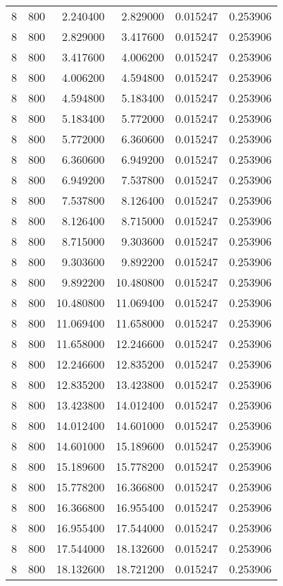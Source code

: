 \begin{longtable}{rrrrrr}
8 & 800 & 2.240400 & 2.829000 & 0.015247 & 0.253906 \\
8 & 800 & 2.829000 & 3.417600 & 0.015247 & 0.253906 \\
8 & 800 & 3.417600 & 4.006200 & 0.015247 & 0.253906 \\
8 & 800 & 4.006200 & 4.594800 & 0.015247 & 0.253906 \\
8 & 800 & 4.594800 & 5.183400 & 0.015247 & 0.253906 \\
8 & 800 & 5.183400 & 5.772000 & 0.015247 & 0.253906 \\
8 & 800 & 5.772000 & 6.360600 & 0.015247 & 0.253906 \\
8 & 800 & 6.360600 & 6.949200 & 0.015247 & 0.253906 \\
8 & 800 & 6.949200 & 7.537800 & 0.015247 & 0.253906 \\
8 & 800 & 7.537800 & 8.126400 & 0.015247 & 0.253906 \\
8 & 800 & 8.126400 & 8.715000 & 0.015247 & 0.253906 \\
8 & 800 & 8.715000 & 9.303600 & 0.015247 & 0.253906 \\
8 & 800 & 9.303600 & 9.892200 & 0.015247 & 0.253906 \\
8 & 800 & 9.892200 & 10.480800 & 0.015247 & 0.253906 \\
8 & 800 & 10.480800 & 11.069400 & 0.015247 & 0.253906 \\
8 & 800 & 11.069400 & 11.658000 & 0.015247 & 0.253906 \\
8 & 800 & 11.658000 & 12.246600 & 0.015247 & 0.253906 \\
8 & 800 & 12.246600 & 12.835200 & 0.015247 & 0.253906 \\
8 & 800 & 12.835200 & 13.423800 & 0.015247 & 0.253906 \\
8 & 800 & 13.423800 & 14.012400 & 0.015247 & 0.253906 \\
8 & 800 & 14.012400 & 14.601000 & 0.015247 & 0.253906 \\
8 & 800 & 14.601000 & 15.189600 & 0.015247 & 0.253906 \\
8 & 800 & 15.189600 & 15.778200 & 0.015247 & 0.253906 \\
8 & 800 & 15.778200 & 16.366800 & 0.015247 & 0.253906 \\
8 & 800 & 16.366800 & 16.955400 & 0.015247 & 0.253906 \\
8 & 800 & 16.955400 & 17.544000 & 0.015247 & 0.253906 \\
8 & 800 & 17.544000 & 18.132600 & 0.015247 & 0.253906 \\
8 & 800 & 18.132600 & 18.721200 & 0.015247 & 0.253906 \\

\end{longtable}
